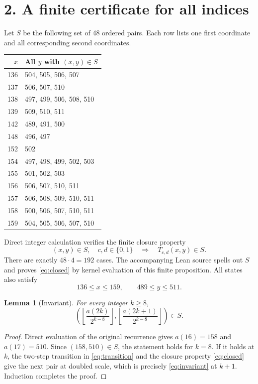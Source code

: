 \documentclass[11pt]{article}
\newtheorem{lemma}[theorem]{Lemma}
\newcommand{\floor}[1]{\left\lfloor #1\right\rfloor}
\begin{document}
\newpage
\section*{2. A finite certificate for all indices}
Let $S$ be the following set of 48 ordered pairs. Each row lists one first coordinate and all corresponding second coordinates.
\begin{center}
\renewcommand{\arraystretch}{1.12}
\begin{tabular}{rl}
\toprule
$x$ & All $y$ with $(x,y)\in S$\\
\midrule
136 & 504, 505, 506, 507\\
137 & 506, 507, 510\\
138 & 497, 499, 506, 508, 510\\
139 & 509, 510, 511\\
142 & 489, 491, 500\\
148 & 496, 497\\
152 & 502\\
154 & 497, 498, 499, 502, 503\\
155 & 501, 502, 503\\
156 & 506, 507, 510, 511\\
157 & 506, 508, 509, 510, 511\\
158 & 500, 506, 507, 510, 511\\
159 & 504, 505, 506, 507, 510\\
\bottomrule
\end{tabular}
\end{center}
Direct integer calculation verifies the finite closure property
\begin{equation}\label{eq:closed}
 (x,y)\in S,\quad c,d\in\{0,1\}
 \quad\Longrightarrow\quad T_{c,d}(x,y)\in S.
\end{equation}
There are exactly $48\cdot4=192$ cases. The accompanying Lean source spells out $S$ and proves \eqref{eq:closed} by kernel evaluation of this finite proposition. All states also satisfy
\begin{equation}\label{eq:coordinate}
 136\le x\le159,\qquad489\le y\le511.
\end{equation}

\begin{lemma}[Invariant]\label{lem:invariant}
For every integer $k\ge8$,
\begin{equation}\label{eq:invariant}
 \left(\floor{\frac{a(2k)}{2^{k-8}}},\floor{\frac{a(2k+1)}{2^{k-8}}}\right)\in S.
\end{equation}
\end{lemma}
\begin{proof}
Direct evaluation of the original recurrence gives $a(16)=158$ and $a(17)=510$. Since $(158,510)\in S$, the statement holds for $k=8$. If it holds at $k$, the two-step transition in \eqref{eq:transition} and the closure property \eqref{eq:closed} give the next pair at doubled scale, which is precisely \eqref{eq:invariant} at $k+1$. Induction completes the proof.
\end{proof}
\end{document}

